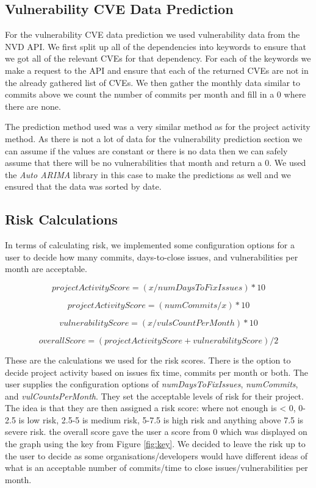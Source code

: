 \documentclass[conference]{IEEEtran}
\begin{document}
\subsection{Vulnerability CVE Data Prediction}
For the vulnerability CVE data prediction we used vulnerability data from the NVD API. We first split up all of the dependencies into keywords to ensure that we got all of the relevant CVEs for that dependency. For each of the keywords we make a request to the API and ensure that each of the returned CVEs are not in the already gathered list of CVEs. We then gather the monthly data similar to commits above we count the number of commits per month and fill in a 0 where there are none. 

The prediction method used was a very similar method as for the project activity method. As there is not a lot of data for the vulnerability prediction section we can assume if the values are constant or there is no data then we can safely assume that there will be no vulnerabilities that month and return a 0. We used the \textit{Auto ARIMA} library in this case to make the predictions as well and we ensured that the data was sorted by date. 

\subsection{Risk Calculations}
In terms of calculating risk, we implemented some configuration options for a user to decide how many commits, days-to-close issues, and vulnerabilities per month are acceptable. 

\[ projectActivityScore = ( x / numDaysToFixIssues ) * 10\]

\[ projectActivityScore = ( numCommits / x ) * 10\]

\[vulnerabilityScore = ( x / vulsCountPerMonth ) * 10\]

\[overallScore = ( projectActivityScore + vulnerabilityScore) / 2\]

These are the calculations we used for the risk scores. There is the option to decide project activity based on issues fix time, commits per month or both. The user supplies the configuration options of \textit{numDaysToFixIssues}, \textit{numCommits}, and \textit{vulCountsPerMonth}. They set the acceptable levels of risk for their project. The idea is that they are then assigned a risk score: where not enough is < 0, 0-2.5 is low risk, 2.5-5 is medium risk, 5-7.5 is high risk and anything above 7.5 is severe risk. the overall score gave the user a score from 0 which was displayed on the graph using the key from Figure \ref{fig:key}. We decided to leave the risk up to the user to decide as some organisations/developers would have different ideas of what is an acceptable number of commits/time to close issues/vulnerabilities per month. 
\end{document}
